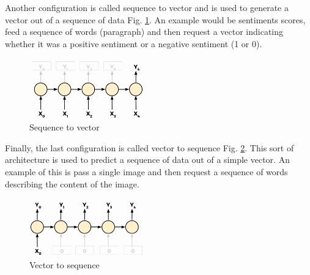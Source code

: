 \documentclass{article}
\begin{document}
Another configuration is called sequence to vector and is used to generate a vector out of a sequence of data Fig. \ref{fig:f22}. An example would be sentiments scores, feed a sequence of words (paragraph) and then request a vector indicating whether it was a positive sentiment or a negative sentiment (1 or 0).

\begin{figure}[ht]
    \centering
    \includegraphics[width=0.45\textwidth,height=0.45\textheight,keepaspectratio]{images/sequence_vector.png}
    \captionsetup{justification=centering}
    \caption{Sequence to vector}
    \label{fig:f22}
\end{figure}

Finally, the last configuration is called vector to sequence Fig. \ref{fig:f23}. This sort of architecture is used to predict a sequence of data out of a simple vector. An example of this is pass a single image and then request a sequence of words describing the content of the image. 

\begin{figure}[ht]
    \centering
    \includegraphics[width=0.45\textwidth,height=0.45\textheight,keepaspectratio]{images/vector_sequence.png}
    \captionsetup{justification=centering}
    \caption{Vector to sequence}
    \label{fig:f23}
\end{figure}



\printbibliography
\end{document}
